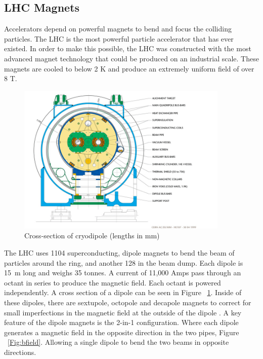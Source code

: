 \subsection{LHC Magnets} 
Accelerators depend on powerful magnets to bend and focus the colliding particles. The LHC is the most powerful particle accelerator that has ever existed. In order to make this possible, the LHC was constructed with the most advanced magnet technology that could be produced on an industrial scale. These magnets are cooled to below 2 K and produce an extremely uniform field of over 8 T.\newline
\begin{figure}[h]
\begin{center}
\includegraphics*[width=0.90\textwidth] {figures/Cross-section-of-a-LHC-superconducting-cryodipole-85}%
\caption[Cross-section of cryodipole]{Cross-section of cryodipole (lengths in mm)}
\label{fig:cryo_cross}
\end{center}
\end{figure}

\indent The LHC uses 1104 superconducting, dipole magnets to bend the beam of particles around the ring, and another 128 in the beam dump.  Each dipole is 15~m long and weighs 35 tonnes. A current of 11,000 Amps pass through an octant in series to produce the magnetic field. Each octant is powered independently. A cross section of a dipole can be seen in Figure ~\ref{fig:cryo_cross}. Inside of these dipoles, there are sextupole, octopole and decapole magnets to correct for small imperfections in the magnetic field at the outside of the dipole \cite{Evans_2008}. A key feature of the dipole magnets is the 2-in-1 configuration. Where each dipole generates a magnetic field in the opposite direction in the two pipes, Figure ~\ref{Fig:bfield}. Allowing a single dipole to bend the two beams in opposite directions.  \newline

